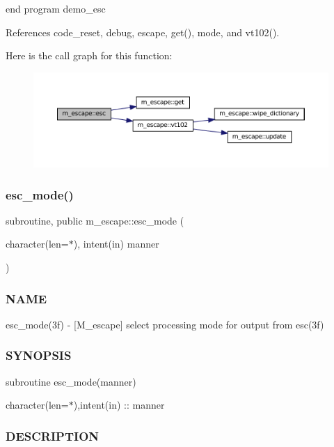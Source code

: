 end program demo\+\_\+esc 

References code\+\_\+reset, debug, escape, get(), mode, and vt102().

Here is the call graph for this function\+:\nopagebreak
\begin{figure}[H]
\begin{center}
\leavevmode
\includegraphics[width=350pt]{namespacem__escape_a36f016baad6b23f86189e6f3ee6db0cb_cgraph}
\end{center}
\end{figure}
\mbox{\label{namespacem__escape_a4210456d81d9a1bf328093a9635e640b}} 
\subsubsection{\texorpdfstring{esc\+\_\+mode()}{esc\_mode()}}
{\footnotesize\ttfamily subroutine, public m\+\_\+escape\+::esc\+\_\+mode (\begin{DoxyParamCaption}\item[{character(len=$\ast$), intent(in)}]{manner }\end{DoxyParamCaption})}



\subsubsection*{N\+A\+ME}

esc\+\_\+mode(3f) -\/ \mbox{[}M\+\_\+escape\mbox{]} select processing mode for output from esc(3f) \subsubsection*{S\+Y\+N\+O\+P\+S\+IS}

subroutine esc\+\_\+mode(manner)

character(len=$\ast$),intent(in) \+:\+: manner \subsubsection*{D\+E\+S\+C\+R\+I\+P\+T\+I\+ON}

